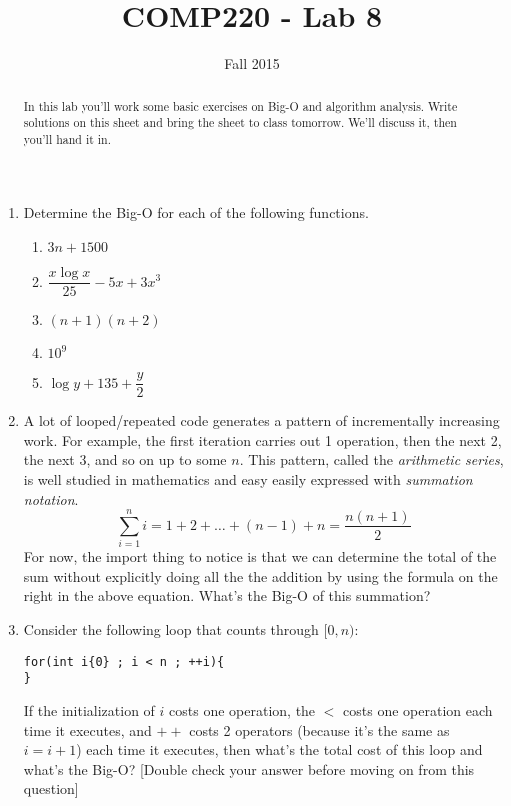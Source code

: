 \documentclass[10pt]{article}
\title{COMP220 - Lab 8}
\author{ }
\date{Fall 2015}
\begin{document}
\maketitle
\thispagestyle{empty}

\begin{abstract}
In this lab you'll work some basic exercises on Big-O and algorithm analysis. Write solutions on this sheet and bring the sheet to class tomorrow. We'll discuss it, then you'll hand it in.
\end{abstract}

\begin{enumerate}
\item Determine the Big-O for each of the following functions.
\begin{enumerate}
\item $3n+1500$
\vspace{.35in}
\item $\dfrac{x\log x}{25} - 5x + 3x^3$
\vspace{.35in}
\item $(n+1)(n+2)$
\vspace{.35in}
\item $10^9$
\vspace{.35in}
\item $\log y + 135 + \dfrac{y}{2}$
\vspace{.35in}
\end{enumerate}
\item A lot of looped/repeated code generates a pattern of incrementally increasing work. For example, the first iteration carries out 1 operation, then the next 2, the next 3, and so on up to some $n$. This pattern, called the \textit{arithmetic series}, is well studied in mathematics and easy easily expressed with \textit{summation notation}. 
\[
\sum\limits_{i=1}^{n} i = 1 + 2 + \ldots + (n-1) + n =  \dfrac{n(n+1)}{2}
\]
For now, the import thing to notice is that we can determine the total of the sum without explicitly doing all the the addition by using the formula on the right in the above equation. What's the Big-O of this summation? 
\newpage \thispagestyle{empty}
\item Consider the following loop that counts through $[0,n)$:
\begin{center}
\begin{lstlisting}
for(int i{0} ; i < n ; ++i){ 
}
\end{lstlisting}
\end{center}
If the initialization of $i$ costs one operation, the $<$ costs one operation each time it executes, and $++$ costs 2 operators (because it's the same as $i=i+1$) each time it executes, then what's the total cost of this loop and what's the Big-O? [Double check your answer before moving on from this question]

\end{enumerate}
\end{document}
